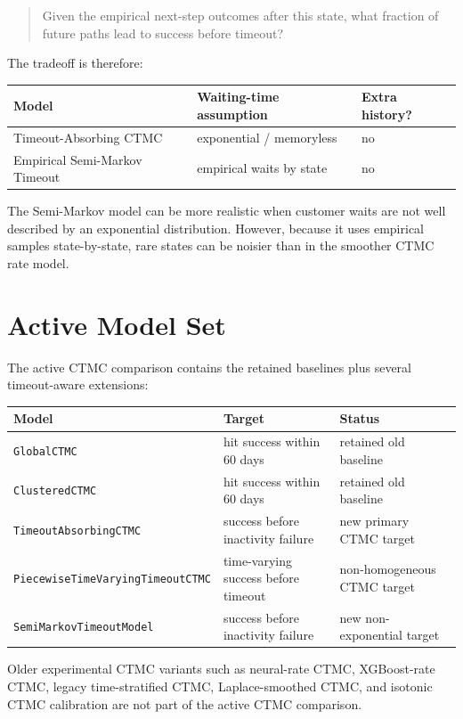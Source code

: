 \documentclass[11pt]{article}
\begin{document}
\begin{quote}
Given the empirical next-step outcomes after this state, what fraction of
future paths lead to success before timeout?
\end{quote}

The tradeoff is therefore:

\begin{center}
\begin{tabular}{lll}
\toprule
Model & Waiting-time assumption & Extra history? \\
\midrule
Timeout-Absorbing CTMC & exponential / memoryless & no \\
Empirical Semi-Markov Timeout & empirical waits by state & no \\
\bottomrule
\end{tabular}
\end{center}

The Semi-Markov model can be more realistic when customer waits are not well
described by an exponential distribution. However, because it uses empirical
samples state-by-state, rare states can be noisier than in the smoother CTMC
rate model.

\section{Active Model Set}

The active CTMC comparison contains the retained baselines plus several
timeout-aware extensions:

\begin{center}
\begin{tabular}{lll}
\toprule
Model & Target & Status \\
\midrule
\texttt{GlobalCTMC} & hit success within 60 days & retained old baseline \\
\texttt{ClusteredCTMC} & hit success within 60 days & retained old baseline \\
\texttt{TimeoutAbsorbingCTMC} & success before inactivity failure & new primary CTMC target \\
\texttt{PiecewiseTimeVaryingTimeoutCTMC} & time-varying success before timeout & non-homogeneous CTMC target \\
\texttt{SemiMarkovTimeoutModel} & success before inactivity failure & new non-exponential target \\
\bottomrule
\end{tabular}
\end{center}

Older experimental CTMC variants such as neural-rate CTMC, XGBoost-rate CTMC,
legacy time-stratified CTMC, Laplace-smoothed CTMC, and isotonic CTMC
calibration are not part of the active CTMC comparison.
\end{document}
